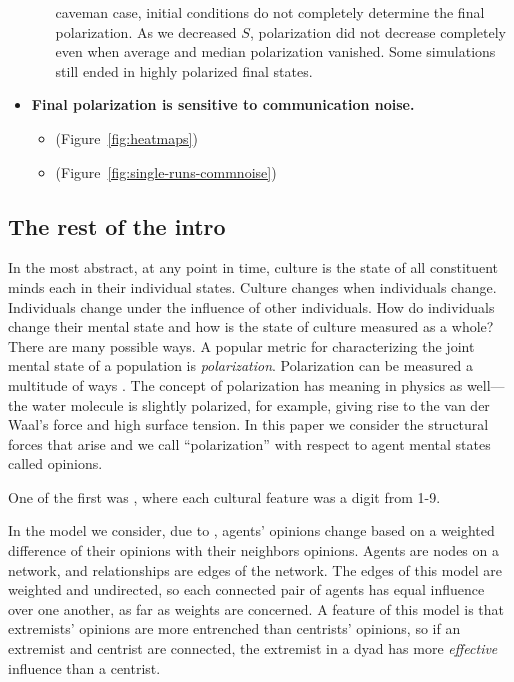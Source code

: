 \documentclass[11pt,letterpaper]{article}
\begin{document}
\begin{itemize}
\begin{itemize}
        caveman case, initial conditions do not completely determine the
        final polarization. As we decreased $S$, polarization did not 
        decrease completely even when average and median polarization vanished.
        Some simulations still ended in highly polarized final states.
    \end{itemize}
  \item \textbf{Final polarization is sensitive to communication noise.}    
    \begin{itemize}
      \item (Figure~\ref{fig:heatmaps})
      \item (Figure~\ref{fig:single-runs-commnoise})
    \end{itemize}
\end{itemize}

\subsection{The rest of the intro}

In the most abstract, at any point in time, culture is the state of all
constituent minds each in their individual states. Culture changes when 
individuals change. Individuals change under the influence of other 
individuals. How do individuals change their mental state and how is the
state of culture measured as a whole? There are many possible ways. A popular
metric for characterizing the joint mental state 
of a population is \emph{polarization}.
Polarization can be measured a multitude of ways \cite{Bramson2016}. The 
concept of polarization has meaning in physics as well---the water molecule
is slightly polarized, for example, giving rise to the van der Waal's force
and high surface tension. In this paper we consider the structural forces that
arise and we call ``polarization'' with respect to agent mental states called
opinions. 

One of the first was \cite{Axelrod1997}, where each cultural feature was a 
digit from 1-9. 

In the model we consider, due to , agents' opinions
change based on a weighted difference of their opinions with their neighbors
opinions. Agents are nodes on a network, and relationships are edges of the
network. The edges of this model are weighted and undirected, so each 
connected pair of agents has equal influence over one another, as far as
weights are concerned. A feature of this model is that extremists' opinions
are more entrenched than centrists' opinions, so if an extremist and centrist
are connected, the extremist in a dyad has more \emph{effective} influence 
than a centrist. 
\end{document}

